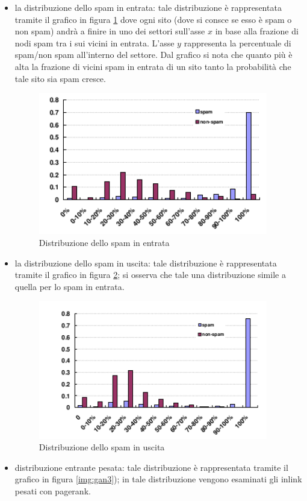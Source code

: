 \begin{itemize}
 \item la distribuzione dello spam in entrata: tale distribuzione è rappresentata  tramite il grafico in figura \ref{img:gan1}  dove ogni sito (dove si consce se esso è spam o non spam) andrà a finire in uno dei settori sull'asse \(x\) in base alla frazione di nodi spam tra i sui vicini in entrata. L'asse \(y\) rappresenta la percentuale di spam/non spam all'interno del settore. Dal grafico si nota che quanto più è alta la frazione di vicini spam in entrata di un sito tanto la probabilità che tale sito sia spam cresce.  
 \begin{figure}
 \centering
\includegraphics[width=10cm]{immagini/gan/immagine1.png}
\caption{Distribuzione dello spam in entrata}
\label{img:gan1}
\end{figure}
\item la distribuzione dello spam in uscita: tale distribuzione è rappresentata  tramite il grafico in figura \ref{img:gan2}; si osserva che tale una distribuzione simile a quella per lo spam in entrata.
 \begin{figure}
 \centering
\includegraphics[width=10cm]{immagini/gan/immagine2.png}
\caption{Distribuzione dello spam in uscita}
\label{img:gan2}
\end{figure}
\item distribuzione entrante pesata: tale distribuzione è rappresentata  tramite il grafico in figura \ref{img:gan3}); in tale distribuzione vengono esaminati gli inlink pesati con pagerank.

\end{itemize}
